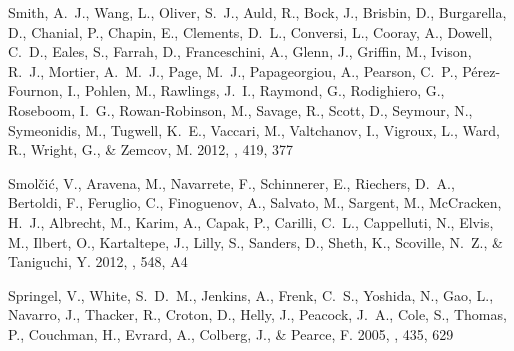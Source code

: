 \documentclass[iop]{emulateapj}
\begin{document}
\begin{thebibliography}{107}
{Smith}, A.~J., {Wang}, L., {Oliver}, S.~J., {Auld}, R., {Bock}, J., {Brisbin},
  D., {Burgarella}, D., {Chanial}, P., {Chapin}, E., {Clements}, D.~L.,
  {Conversi}, L., {Cooray}, A., {Dowell}, C.~D., {Eales}, S., {Farrah}, D.,
  {Franceschini}, A., {Glenn}, J., {Griffin}, M., {Ivison}, R.~J., {Mortier},
  A.~M.~J., {Page}, M.~J., {Papageorgiou}, A., {Pearson}, C.~P.,
  {P{\'e}rez-Fournon}, I., {Pohlen}, M., {Rawlings}, J.~I., {Raymond}, G.,
  {Rodighiero}, G., {Roseboom}, I.~G., {Rowan-Robinson}, M., {Savage}, R.,
  {Scott}, D., {Seymour}, N., {Symeonidis}, M., {Tugwell}, K.~E., {Vaccari},
  M., {Valtchanov}, I., {Vigroux}, L., {Ward}, R., {Wright}, G., \& {Zemcov},
  M. 2012, \mnras, 419, 377

{Smol{\v c}i{\'c}}, V., {Aravena}, M., {Navarrete}, F., {Schinnerer}, E.,
  {Riechers}, D.~A., {Bertoldi}, F., {Feruglio}, C., {Finoguenov}, A.,
  {Salvato}, M., {Sargent}, M., {McCracken}, H.~J., {Albrecht}, M., {Karim},
  A., {Capak}, P., {Carilli}, C.~L., {Cappelluti}, N., {Elvis}, M., {Ilbert},
  O., {Kartaltepe}, J., {Lilly}, S., {Sanders}, D., {Sheth}, K., {Scoville},
  N.~Z., \& {Taniguchi}, Y. 2012, \aap, 548, A4

{Springel}, V., {White}, S.~D.~M., {Jenkins}, A., {Frenk}, C.~S., {Yoshida},
  N., {Gao}, L., {Navarro}, J., {Thacker}, R., {Croton}, D., {Helly}, J.,
  {Peacock}, J.~A., {Cole}, S., {Thomas}, P., {Couchman}, H., {Evrard}, A.,
  {Colberg}, J., \& {Pearce}, F. 2005, \nat, 435, 629


\end{thebibliography}
\end{document}
